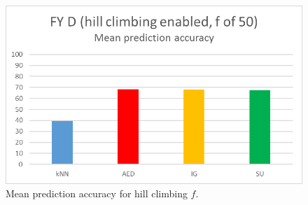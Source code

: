 \begin{figure}[hp]
\includegraphics[scale=0.17]{Graphs/FY_D/H_bar}
\caption{Mean prediction accuracy for hill climbing $f$.}
\label{fig:bar_h}
\end{figure}

